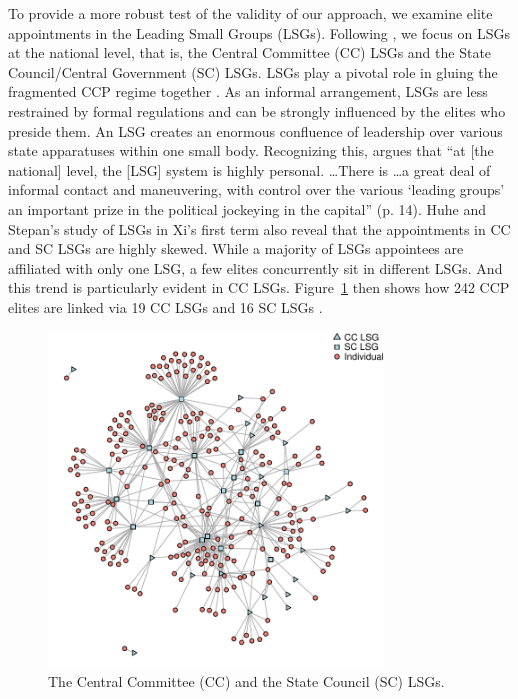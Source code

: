\documentclass[11pt,english]{article}
\providecommand{\DIFaddbeginFL}{} %
\providecommand{\DIFaddendFL}{} %
\providecommand{\DIFdelbeginFL}{} %
\providecommand{\DIFdelendFL}{} %
\newcommand{\DIFscaledelfig}{0.5}
\newlength{\DIFdelgraphicswidth} %
\newlength{\DIFdelgraphicsheight} %
\newcommand{\DIFaddincludegraphics}[2][]{{\color{blue}\fbox{\DIFOincludegraphics[#1]{#2}}}} %
\newcommand{\DIFdelincludegraphics}[2][]{%
\sbox{\DIFdelgraphicsbox}{\DIFOincludegraphics[#1]{#2}}%
\settoboxwidth{\DIFdelgraphicswidth}{\DIFdelgraphicsbox} %
\settoboxtotalheight{\DIFdelgraphicsheight}{\DIFdelgraphicsbox} %
\scalebox{\DIFscaledelfig}{%
\parbox[b]{\DIFdelgraphicswidth}{\usebox{\DIFdelgraphicsbox}\\[-\baselineskip] \rule{\DIFdelgraphicswidth}{0em}}\llap{\resizebox{\DIFdelgraphicswidth}{\DIFdelgraphicsheight}{%
\setlength{\unitlength}{\DIFdelgraphicswidth}%
\begin{picture}(1,1)%
\thicklines\linethickness{2pt} %
{\color[rgb]{1,0,0}\put(0,0){\framebox(1,1){}}}%
{\color[rgb]{1,0,0}\put(0,0){\line( 1,1){1}}}%
{\color[rgb]{1,0,0}\put(0,1){\line(1,-1){1}}}%
\end{picture}%
}\hspace*{3pt}}} %
} %
\DeclareRobustCommand{\DIFaddbeginFL}{\DIFOaddbeginFL \let\includegraphics\DIFaddincludegraphics} %
\DeclareRobustCommand{\DIFaddendFL}{\DIFOaddendFL \let\includegraphics\DIFOincludegraphics} %
\DeclareRobustCommand{\DIFdelbeginFL}{\DIFOdelbeginFL \let\includegraphics\DIFdelincludegraphics} %
\DeclareRobustCommand{\DIFdelendFL}{\DIFOaddendFL \let\includegraphics\DIFOincludegraphics} %
\begin{document}
\begin{flushleft}
To provide a more robust test of the validity of our approach, we examine elite appointments in the Leading Small Groups (LSGs). Following \citet{Huhe2018a}, we focus on LSGs at the national level, that is, the Central Committee (CC) LSGs and the State Council/Central Government (SC) LSGs. LSGs play a pivotal role in gluing the fragmented CCP regime together \citep{Hamrin1992}. As an informal arrangement, LSGs are less restrained by formal regulations and can be strongly influenced by the elites who preside them. An LSG creates an enormous confluence of leadership over various state apparatuses within one small body. Recognizing this, \citet{Lieberthal1992a} argues that ``at {[}the national{]} level, the {[}LSG{]} system is highly personal. \ldots There is \ldots a great deal of informal contact and maneuvering, with control over the various `leading groups' an important prize in the political jockeying in the capital'' (p. 14). Huhe and Stepan's \citeyearpar{Huhe2018a} study of LSGs in Xi's first term also reveal that the appointments in CC and SC LSGs are highly skewed. While a majority of LSGs appointees are affiliated with only one LSG, a few elites concurrently sit in different LSGs. And this trend is particularly evident in CC LSGs. Figure~\ref{fig:lsgNet} then shows how 242 CCP elites are linked via 19 CC LSGs and 16 SC LSGs \citep{Batke2017,Huhe2018a}.

\noindent \begin{center}
\begin{figure}[H]
\noindent \begin{centering}
\DIFdelbeginFL %
\DIFdelendFL \DIFaddbeginFL \includegraphics[width=3.5in]{LSG_full}
\DIFaddendFL \par\end{centering}
\caption{The Central Committee (CC) and the State Council (SC) LSGs.}
\label{fig:lsgNet}
\end{figure}
\par\end{center}


\end{flushleft}
\end{document}
